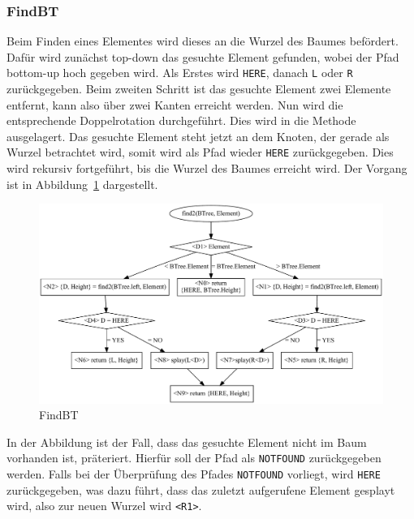 \subsubsection{FindBT}\label{par:splay-findBT}
Beim Finden eines Elementes wird dieses an die Wurzel des Baumes befördert.
Dafür wird zunächst top-down das gesuchte Element gefunden, wobei der Pfad
bottom-up hoch gegeben wird.
Als Erstes wird \verb|HERE|, danach \verb|L| oder \verb|R| zurückgegeben.
Beim zweiten Schritt ist das gesuchte Element zwei Elemente entfernt, kann also über zwei
Kanten erreicht werden.
Nun wird die entsprechende Doppelrotation durchgeführt.
Dies wird in die  Methode ausgelagert.
Das gesuchte Element steht jetzt an dem Knoten, der gerade als Wurzel betrachtet wird, somit wird
als Pfad wieder \verb|HERE| zurückgegeben.
Dies wird rekursiv fortgeführt, bis die Wurzel des Baumes erreicht wird.
Der Vorgang ist in Abbildung~\ref{fig:splayFind} dargestellt.
\begin{figure}[hbt]
    \centering
    \includegraphics[scale = 0.35]{img/gv/splayFind2}
    \caption{FindBT}
    \label{fig:splayFind}
\end{figure}

In der Abbildung ist der Fall, dass das gesuchte Element nicht im Baum vorhanden ist, präteriert.
Hierfür soll der Pfad als \verb|NOTFOUND| zurückgegeben werden.
Falls bei der Überprüfung des Pfades \verb|NOTFOUND| vorliegt, wird \verb|HERE|
zurückgegeben, was dazu führt, dass das zuletzt aufgerufene Element gesplayt wird, also zur
neuen Wurzel wird \verb|<R1>|.


